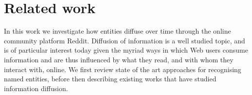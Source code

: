 \documentclass[review]{elsarticle}
\begin{document}
%
%
%
%



\section{Related work}
\label{sec:rw}
In this work we investigate how entities diffuse over time through the online community platform Reddit.
Diffusion of information is a well studied topic, and is of particular interest today given the myriad ways in which Web users consume information and are thus influenced by what they read, and with whom they interact with, online.
We first review state of the art approaches for recognising named entities, before then describing existing works that have studied information diffusion.
\end{document}
